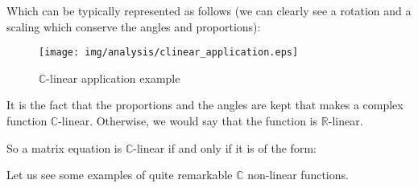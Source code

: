 	Which can be typically represented as follows (we can clearly see a rotation and a scaling which conserve the angles and proportions):

	\begin{figure}[H]
		\centering
		\texttt{[image: img/analysis/clinear\_application.eps]}
		\caption{$\mathbb{C}$-linear application example}
	\end{figure}

	It is the fact that the proportions and the angles are kept that makes a complex function $\mathbb{C}$-linear. Otherwise, we would say that the function is $\mathbb{R}$-linear.

	So a matrix equation is $\mathbb{C}$-linear if and only if it is of the form:
	
	Let us see some examples of quite remarkable $\mathbb{C}$ non-linear functions.

